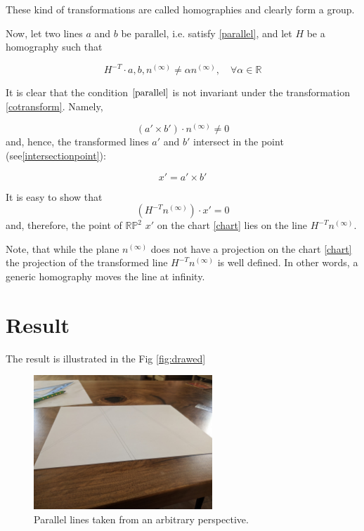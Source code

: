 \documentclass[a4paper,10pt]{article}
\begin{document}
These kind of transformations are called homographies and clearly form a group. 

Now, let two lines $a$ and $b$ be parallel, i.e. satisfy \eqref{parallel},  and let $H$ be a homography such that

\begin{equation}
H^{-T} \cdot a,b,n^{(\infty)}  \neq \alpha n^{(\infty)} , \quad \forall \alpha \in \mathbb{R}
\end{equation}

 It is clear that the condition $\eqref{parallel}$ is not invariant under the transformation \eqref{cotransform}. Namely,

\begin{equation}
(a'\times b')\cdot  n^{(\infty)} \neq 0
\end{equation} 
 and, hence, the transformed lines $a'$ and $b'$ intersect in the point (see\eqref{intersectionpoint}):

\begin{equation}
x' = a' \times b'
\end{equation}

It is easy to show that 
\begin{equation}
(H^{-T}n^{(\infty)}) \cdot x'  = 0
\end{equation}
and, therefore, the point of $\mathbb{RP}^2$ $x'$ on the chart \eqref{chart} lies on the line $H^{-T}n^{(\infty)}$. 

Note, that while the plane $n^{(\infty)}$ does not have a projection on the chart \eqref{chart} the projection of the  transformed line $H^{-T}n^{(\infty)}$ is well defined. In other words, a generic homography moves the line at infinity.


\section{Result}

The result is illustrated in the Fig \ref{fig:drawed}

\begin{figure}[h]
\centering
 \includegraphics[width=0.6\textwidth]{../../images/parallel.jpg}
 \caption{Parallel lines taken from an arbitrary perspective. }
 \label{fig:3dcart}
\end{figure}
\end{document}
